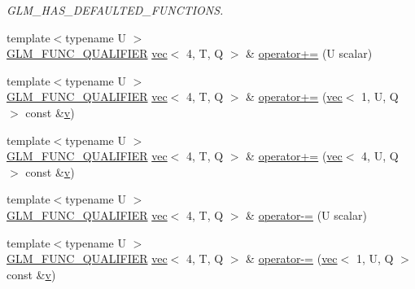 \begin{DoxyCompactItemize}
\begin{DoxyCompactList}\small\item\em G\+L\+M\+\_\+\+H\+A\+S\+\_\+\+D\+E\+F\+A\+U\+L\+T\+E\+D\+\_\+\+F\+U\+N\+C\+T\+I\+O\+NS. \end{DoxyCompactList}\item 
{\footnotesize template$<$typename U $>$ }\\\hyperlink{setup_8hpp_a33fdea6f91c5f834105f7415e2a64407}{G\+L\+M\+\_\+\+F\+U\+N\+C\+\_\+\+Q\+U\+A\+L\+I\+F\+I\+ER} \hyperlink{structglm_1_1vec}{vec}$<$ 4, T, Q $>$ \& \hyperlink{structglm_1_1vec_3_014_00_01_t_00_01_q_01_4_a96606ae109d8037bfb8ff43c40b25609}{operator+=} (U scalar)
\item 
{\footnotesize template$<$typename U $>$ }\\\hyperlink{setup_8hpp_a33fdea6f91c5f834105f7415e2a64407}{G\+L\+M\+\_\+\+F\+U\+N\+C\+\_\+\+Q\+U\+A\+L\+I\+F\+I\+ER} \hyperlink{structglm_1_1vec}{vec}$<$ 4, T, Q $>$ \& \hyperlink{structglm_1_1vec_3_014_00_01_t_00_01_q_01_4_af625138d4bb7efba666576ceef07eb17}{operator+=} (\hyperlink{structglm_1_1vec}{vec}$<$ 1, U, Q $>$ const \&\hyperlink{_s_d_l__opengl_8h_a10a82eabcb59d2fcd74acee063775f90}{v})
\item 
{\footnotesize template$<$typename U $>$ }\\\hyperlink{setup_8hpp_a33fdea6f91c5f834105f7415e2a64407}{G\+L\+M\+\_\+\+F\+U\+N\+C\+\_\+\+Q\+U\+A\+L\+I\+F\+I\+ER} \hyperlink{structglm_1_1vec}{vec}$<$ 4, T, Q $>$ \& \hyperlink{structglm_1_1vec_3_014_00_01_t_00_01_q_01_4_a39b0ffcd7cb03511bb234d52860f5ce8}{operator+=} (\hyperlink{structglm_1_1vec}{vec}$<$ 4, U, Q $>$ const \&\hyperlink{_s_d_l__opengl_8h_a10a82eabcb59d2fcd74acee063775f90}{v})
\item 
{\footnotesize template$<$typename U $>$ }\\\hyperlink{setup_8hpp_a33fdea6f91c5f834105f7415e2a64407}{G\+L\+M\+\_\+\+F\+U\+N\+C\+\_\+\+Q\+U\+A\+L\+I\+F\+I\+ER} \hyperlink{structglm_1_1vec}{vec}$<$ 4, T, Q $>$ \& \hyperlink{structglm_1_1vec_3_014_00_01_t_00_01_q_01_4_aea3f23ac07ef99b7189102d95bf26a85}{operator-\/=} (U scalar)
\item 
{\footnotesize template$<$typename U $>$ }\\\hyperlink{setup_8hpp_a33fdea6f91c5f834105f7415e2a64407}{G\+L\+M\+\_\+\+F\+U\+N\+C\+\_\+\+Q\+U\+A\+L\+I\+F\+I\+ER} \hyperlink{structglm_1_1vec}{vec}$<$ 4, T, Q $>$ \& \hyperlink{structglm_1_1vec_3_014_00_01_t_00_01_q_01_4_abad73477e54831bdea3d23dfb24ce436}{operator-\/=} (\hyperlink{structglm_1_1vec}{vec}$<$ 1, U, Q $>$ const \&\hyperlink{_s_d_l__opengl_8h_a10a82eabcb59d2fcd74acee063775f90}{v})

\end{DoxyCompactItemize}
